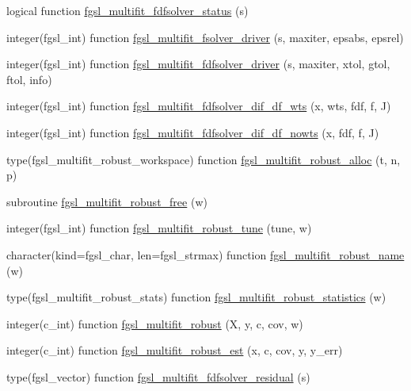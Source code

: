 \begin{DoxyCompactItemize}
\item 
logical function \hyperlink{multifit_8finc_ae28da5d71114b0974e5da3acd305fe34}{fgsl\+\_\+multifit\+\_\+fdfsolver\+\_\+status} (s)
\item 
integer(fgsl\+\_\+int) function \hyperlink{multifit_8finc_a441635d79b414434f17d9e79d5e5e3bf}{fgsl\+\_\+multifit\+\_\+fsolver\+\_\+driver} (s, maxiter, epsabs, epsrel)
\item 
integer(fgsl\+\_\+int) function \hyperlink{multifit_8finc_a1454ee314bc86a3f6401918832977f1c}{fgsl\+\_\+multifit\+\_\+fdfsolver\+\_\+driver} (s, maxiter, xtol, gtol, ftol, info)
\item 
integer(fgsl\+\_\+int) function \hyperlink{multifit_8finc_ac096dd00371635965d0e576d60863766}{fgsl\+\_\+multifit\+\_\+fdfsolver\+\_\+dif\+\_\+df\+\_\+wts} (x, wts, fdf, f, J)
\item 
integer(fgsl\+\_\+int) function \hyperlink{multifit_8finc_ac57d4a18264a780361e572e65e4fdbfc}{fgsl\+\_\+multifit\+\_\+fdfsolver\+\_\+dif\+\_\+df\+\_\+nowts} (x, fdf, f, J)
\item 
type(fgsl\+\_\+multifit\+\_\+robust\+\_\+workspace) function \hyperlink{multifit_8finc_a3654cf72cc42ef37e8ffe3d6ae99d1b0}{fgsl\+\_\+multifit\+\_\+robust\+\_\+alloc} (t, n, p)
\item 
subroutine \hyperlink{multifit_8finc_ac11e8d149c1983ababeef2251b4a0e0f}{fgsl\+\_\+multifit\+\_\+robust\+\_\+free} (w)
\item 
integer(fgsl\+\_\+int) function \hyperlink{multifit_8finc_ab6c0101ec41f2a22cc3441476266d59d}{fgsl\+\_\+multifit\+\_\+robust\+\_\+tune} (tune, w)
\item 
character(kind=fgsl\+\_\+char, len=fgsl\+\_\+strmax) function \hyperlink{multifit_8finc_a60a15f7b62aa2c94615909be755ddb56}{fgsl\+\_\+multifit\+\_\+robust\+\_\+name} (w)
\item 
type(fgsl\+\_\+multifit\+\_\+robust\+\_\+stats) function \hyperlink{multifit_8finc_a75250ed81d817a7a428dd8ec8adc08dd}{fgsl\+\_\+multifit\+\_\+robust\+\_\+statistics} (w)
\item 
integer(c\+\_\+int) function \hyperlink{multifit_8finc_af06ff4c9c8558a30bdf902feb7052d92}{fgsl\+\_\+multifit\+\_\+robust} (X, y, c, cov, w)
\item 
integer(c\+\_\+int) function \hyperlink{multifit_8finc_add53db0407ecf7e59f5be47df7b6f6ed}{fgsl\+\_\+multifit\+\_\+robust\+\_\+est} (x, c, cov, y, y\+\_\+err)
\item 
type(fgsl\+\_\+vector) function \hyperlink{multifit_8finc_a4b2fb8a16a79e33049cbc6a4e7feb4d1}{fgsl\+\_\+multifit\+\_\+fdfsolver\+\_\+residual} (s)

\end{DoxyCompactItemize}
